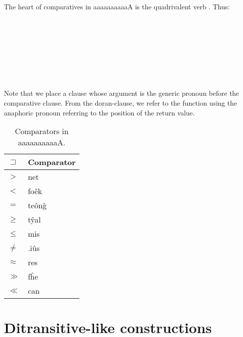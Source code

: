 \documentclass{book}
\newcommand{\lname}{aaaaaaaaaaA}
\begin{document}
The heart of comparatives in \lname{} is the quadrivalent verb . Thus: \\
~\\
 \\
      \hlvii{$>$} \\
      \\
~\\
 \\
       \hlviii{$>$} \\
      \\

Note that we place a clause whose argument is the generic pronoun before the comparative clause. From the doran-clause, we refer to the function using the anaphoric pronoun referring to the position of the return value.

\begin{table}[h]
    \caption{Comparators in \lname.}
    \centering
    \begin{tabular}{|l|>{\kardinal}l|}
        \hline
        $\sqsupset$ & \textnormal{Comparator} \\
        \hline
        $>$ & net \\
        $<$ & fo\^ek \\
        $=$ & te\^on\^g \\
        $\ge$ & t\^yal \\
        $\le$ & mis \\
        $\ne$ & .i\^us \\
        $\approx$ & res \\
        $\gg$ & f\^he \\
        $\ll$ & can \\
        \hline
    \end{tabular}
\end{table}

\section{Ditransitive-like constructions}
\end{document}

